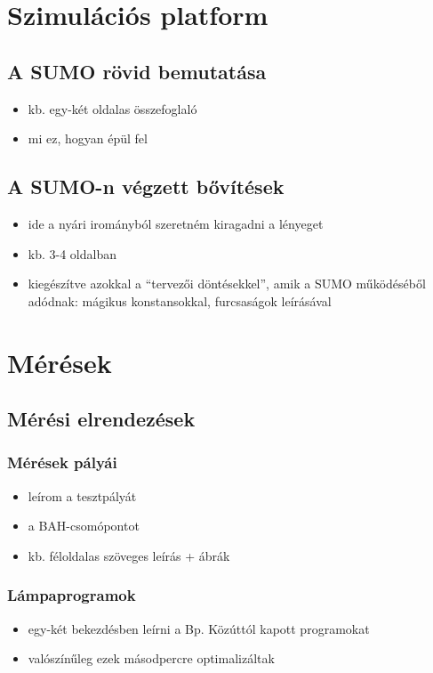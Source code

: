 \documentclass{report}
\begin{document}
	\chapter{Szimulációs platform}
		\label{sec:sumo}
		\section{A SUMO rövid bemutatása}
			\begin{itemize}
				\item kb. egy-két oldalas összefoglaló
				\item mi ez, hogyan épül fel
			\end{itemize}
		\section{A SUMO-n végzett bővítések}
			\begin{itemize}
				\item ide a nyári irományból szeretném kiragadni a lényeget
				\item kb. 3-4 oldalban
				\item kiegészítve azokkal a ``tervezői döntésekkel'', amik a SUMO működéséből adódnak: mágikus konstansokkal, furcsaságok leírásával
			\end{itemize}
	
	\chapter{Mérések}
		\section{Mérési elrendezések}
			\subsection{Mérések pályái}
				\begin{itemize}
					\item leírom a tesztpályát
					\item a BAH-csomópontot
					\item kb. féloldalas szöveges leírás + ábrák
				\end{itemize}
			\subsection{Lámpaprogramok}
				\begin{itemize}
					\item egy-két bekezdésben leírni a Bp. Közúttól kapott programokat
					\item valószínűleg ezek másodpercre optimalizáltak
				\end{itemize}
\end{document}
